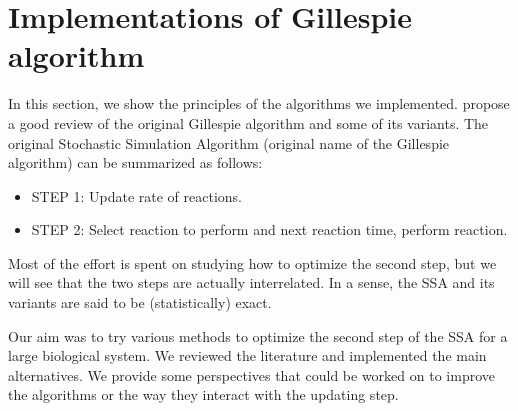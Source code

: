 \graphicspath{{\relativepath/figures/}}

\section{Implementations of Gillespie algorithm}
\label{sec:algorithm}

In this section, we show the principles of the algorithms we implemented.
\citet{gillespie_perspective:_2013} propose a good review of the original Gillespie algorithm and some of its variants.
The original Stochastic Simulation Algorithm
(original name of the Gillespie algorithm)
can be summarized as follows:

\begin{itemize}
\item STEP 1: Update rate of reactions.
\item STEP 2: Select reaction to perform and next reaction time, perform reaction.
\end{itemize}

Most of the effort is spent on studying how to optimize the second step,
but we will see that the two steps are actually interrelated.
In a sense, the SSA and its variants are said to be (statistically) exact.

Our aim was to try various methods to optimize the second step of the SSA for a large biological system.
We reviewed the literature and implemented the main alternatives.
We provide some perspectives that could be worked on to improve the algorithms
or the way they interact with the updating step.




